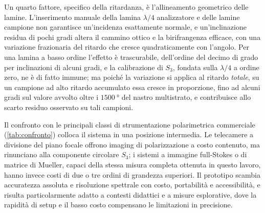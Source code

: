 Un quarto fattore, specifico della ritardanza, è l'allineamento geometrico delle lamine. L'inserimento manuale della lamina $\lambda/4$ analizzatore e delle lamine campione non garantisce un'incidenza esattamente normale, e un'inclinazione residua di pochi gradi altera il cammino ottico e la birifrangenza efficace, con una variazione frazionaria del ritardo che cresce quadraticamente con l'angolo. Per una lamina a basso ordine l'effetto è trascurabile, dell'ordine del decimo di grado per inclinazioni di alcuni gradi, e la calibrazione di $S_3$, fondata sulla $\lambda/4$ a ordine zero, ne è di fatto immune; ma poiché la variazione si applica al ritardo \emph{totale}, su un campione ad alto ritardo accumulato essa cresce in proporzione, fino ad alcuni gradi sul valore avvolto oltre i $\SI{1500}{\degree}$ del nastro multistrato, e contribuisce allo scarto residuo osservato su tali campioni.

Il confronto con le principali classi di strumentazione polarimetrica commerciale (\cref{tab:confronto}) colloca il sistema in una posizione intermedia. Le telecamere a divisione del piano focale offrono imaging di polarizzazione a costo contenuto, ma rinunciano alla componente circolare $S_3$; i sistemi a immagine full-Stokes o di matrice di Mueller, capaci della stessa misura completa ottenuta in questo lavoro, hanno invece costi di due o tre ordini di grandezza superiori. Il prototipo scambia accuratezza assoluta e risoluzione spettrale con costo, portabilità e accessibilità, e risulta particolarmente adatto a contesti didattici e a misure esplorative, dove la rapidità di setup e il basso costo compensano le limitazioni in precisione.

